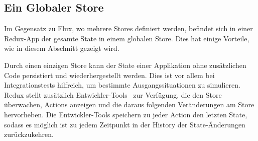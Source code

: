 \subsection{Ein Globaler Store}
\label{ssec:gr_ein_globaler_store}

Im Gegensatz zu Flux, wo mehrere Stores definiert werden, befindet sich in einer
Redux-App der gesamte State in einem globalen Store.  Dies hat einige Vorteile,
wie in diesem Abschnitt gezeigt wird.

Durch einen einzigen Store kann der State einer Applikation ohne zusätzlichen
Code persistiert und wiederhergestellt werden.  Dies ist vor allem bei
Integrationstests hilfreich, um bestimmte Ausgangssituationen zu simulieren.
Redux stellt zusätzlich Entwickler-Tools~\cite{reduxDevTools} zur Verfügung, die
den Store überwachen, Actions anzeigen und die daraus folgenden Veränderungen
am Store hervorheben.  Die Entwickler-Tools speichern zu jeder Action den
letzten State, sodass es möglich ist zu jedem Zeitpunkt in der History der
State-Änderungen zurückzukehren.
